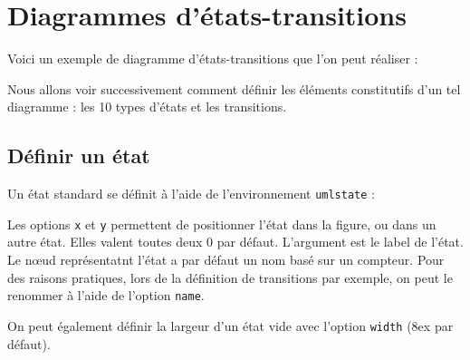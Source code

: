 \documentclass[a4paper,11pt]{report}
\newcommand{\inputTikZ}[1]{%
  }%
\newcommand{\inputTikZ}[1]{%
    \texttt{[image: fig/\#1.pdf]}%
  }%
\begin{document}

\chapter{Diagrammes d'états-transitions}\label{c.statetrans}

Voici un exemple de diagramme d'états-transitions que l'on peut réaliser :

\begin{center}
\inputTikZ{statediagex}
\end{center}

Nous allons voir successivement comment définir les éléments constitutifs d'un tel diagramme : les 10 types d'états et les transitions.

\newpage

\section{Définir un état}\label{s.state}

Un état \og standard\fg{} se définit à l'aide de l'environnement {\tt umlstate} :

\medskip

\begin{minipage}{0.51\textwidth}

\end{minipage}
\begin{minipage}{0.49\textwidth}
\begin{center}
\inputTikZ{state}
\end{center}
\end{minipage}

\medskip

Les options {\tt x} et {\tt y} permettent de positionner l'état dans la figure, ou dans un autre état. Elles valent toutes deux 0 par défaut. L'argument est le label de l'état. Le n\oe{}ud représentatnt l'état a par défaut un nom basé sur un compteur. Pour des raisons pratiques, lors de la définition de transitions par exemple, on peut le renommer à l'aide de l'option {\tt name}.

\medskip

On peut également définir la largeur d'un état vide avec l'option {\tt width} (8ex par défaut).

\medskip
\end{document}
